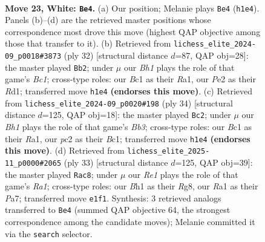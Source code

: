 \documentclass[11pt]{article}
\begin{document}
\clearpage

\begin{figure}[p]\centering
\begin{subfigure}{0.46\textwidth}\centering
\resizebox{\linewidth}{!}{%
\newchessgame
\chessboard[
  setfen={rnb3k1/1p1nb3/p2rppp1/7p/8/1P2P1P1/P1pNPK1P/R1B1R2B w - - 2 23},
  showmover=false,
  pgfstyle=straightmove, color=movearrow, markmove={h1-e4}
]}
\caption{}
\end{subfigure}\hfill
\begin{subfigure}{0.46\textwidth}\centering
\resizebox{\linewidth}{!}{%
\newchessgame
\chessboard[
  setfen={r2rb1k1/pp2npp1/2n1p2p/8/1PP5/P2B1N2/5PPP/R1BR2K1 w - - 1 17},
  showmover=false,
  pgfstyle=straightmove, color=movearrow, markmove={c1-b2}
]}
\caption{}
\end{subfigure}
\\[4pt]
\begin{subfigure}{0.46\textwidth}\centering
\resizebox{\linewidth}{!}{%
\newchessgame
\chessboard[
  setfen={r1b2rk1/1pp2pp1/p5np/n7/3PN3/1BP5/P4PPP/R1BR2K1 w - - 6 18},
  showmover=false,
  pgfstyle=straightmove, color=movearrow, markmove={b3-c2}
]}
\caption{}
\end{subfigure}\hfill
\begin{subfigure}{0.46\textwidth}\centering
\resizebox{\linewidth}{!}{%
\newchessgame
\chessboard[
  setfen={r5r1/pp1bkp1p/2n1pp2/8/5P2/P1R2NP1/1P3PBP/4K2R b K - 2 17},
  showmover=false,
  pgfstyle=straightmove, color=movearrow, markmove={a8-c8}
]}
\caption{}
\end{subfigure}
\caption{\textbf{Move 23, White: \texttt{Be4}.} (a) Our position; Melanie plays \texttt{Be4} (\texttt{h1e4}). Panels (b)--(d) are the retrieved master positions whose correspondence most drove this move (highest QAP objective among those that transfer to it). (b) Retrieved from \texttt{lichess\_elite\_2024-09\_p0018\#3873} (ply 32) [structural distance $d$=87, QAP obj=28]: the master played \texttt{Bb2}; under $\mu$ our \emph{Bh1} plays the role of that game's \emph{Bc1}; cross-type roles: our \emph{B}c1 as their \emph{R}a1, our \emph{P}e2 as their \emph{R}d1; transferred move \texttt{h1e4} \textbf{(endorses this move)}. (c) Retrieved from \texttt{lichess\_elite\_2024-09\_p0020\#198} (ply 34) [structural distance $d$=125, QAP obj=18]: the master played \texttt{Bc2}; under $\mu$ our \emph{Bh1} plays the role of that game's \emph{Bb3}; cross-type roles: our \emph{B}c1 as their \emph{R}a1, our \emph{p}c2 as their \emph{B}c1; transferred move \texttt{h1e4} \textbf{(endorses this move)}. (d) Retrieved from \texttt{lichess\_elite\_2025-11\_p0000\#2065} (ply 33) [structural distance $d$=125, QAP obj=39]: the master played \texttt{Rac8}; under $\mu$ our \emph{Re1} plays the role of that game's \emph{Ra1}; cross-type roles: our \emph{B}h1 as their \emph{R}g8, our \emph{R}a1 as their \emph{P}a7; transferred move \texttt{e1f1}. Synthesis: 3 retrieved analogs transferred to \texttt{Be4} (summed QAP objective 64, the strongest correspondence among the candidate moves); Melanie committed it via the \texttt{search} selector.}
\label{fig:thought-m44}
\end{figure}
\end{document}
